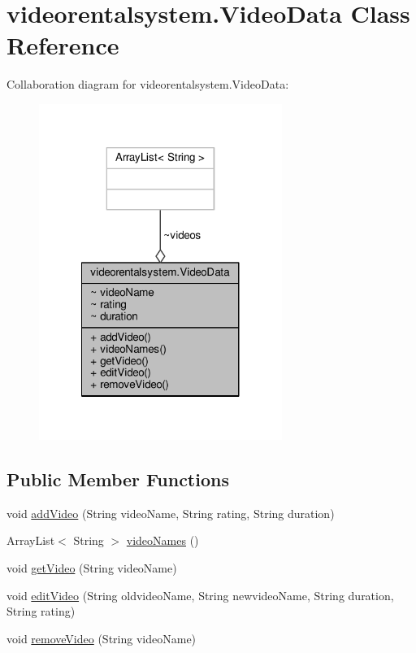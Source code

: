\hypertarget{classvideorentalsystem_1_1VideoData}{\section{videorentalsystem.\-Video\-Data Class Reference}
\label{classvideorentalsystem_1_1VideoData}
}


Collaboration diagram for videorentalsystem.\-Video\-Data\-:
\nopagebreak
\begin{figure}[H]
\begin{center}
\leavevmode
\includegraphics[width=224pt]{classvideorentalsystem_1_1VideoData__coll__graph}
\end{center}
\end{figure}
\subsection*{Public Member Functions}
\begin{DoxyCompactItemize}
\item 
void \hyperlink{classvideorentalsystem_1_1VideoData_a2eafb84494d23316076baf7a02c9ef6b}{add\-Video} (String video\-Name, String rating, String duration)
\item 
Array\-List$<$ String $>$ \hyperlink{classvideorentalsystem_1_1VideoData_ae922fd11560964f9921fa83b4153deef}{video\-Names} ()
\item 
void \hyperlink{classvideorentalsystem_1_1VideoData_abc5353826530e5a91cf9a83a9bdbef57}{get\-Video} (String video\-Name)
\item 
void \hyperlink{classvideorentalsystem_1_1VideoData_a6eb6534b7bb975b801172d7e45b5abbe}{edit\-Video} (String oldvideo\-Name, String newvideo\-Name, String duration, String rating)
\item 
void \hyperlink{classvideorentalsystem_1_1VideoData_a77480f24c0d089793233daf4378dd75f}{remove\-Video} (String video\-Name)
\end{DoxyCompactItemize}


